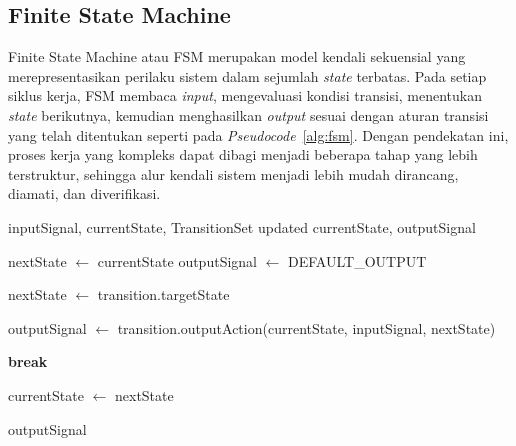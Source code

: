   \subsection{Finite State Machine}

  Finite State Machine atau FSM merupakan model kendali sekuensial yang merepresentasikan
  perilaku sistem dalam sejumlah \emph{state} terbatas. Pada setiap siklus kerja, FSM
  membaca \emph{input}, mengevaluasi kondisi transisi, menentukan \emph{state} berikutnya,
  kemudian menghasilkan \emph{output} sesuai dengan aturan transisi yang telah ditentukan seperti pada \emph{Pseudocode}~\ref{alg:fsm}.
  Dengan pendekatan ini, proses kerja yang kompleks dapat dibagi menjadi beberapa tahap
  yang lebih terstruktur, sehingga alur kendali sistem menjadi lebih mudah dirancang,
  diamati, dan diverifikasi.

  \begin{algorithm}
      \caption{ inite State Machine Algorithm}
      \label{alg:fsm}
      \begin{algorithmic}[1]
      \Require inputSignal, currentState, TransitionSet
      \Ensure updated currentState, outputSignal

          \State nextState $\gets$ currentState
          \State outputSignal $\gets$ DEFAULT\_OUTPUT

                  \State nextState $\gets$ transition.targetState

                  \State outputSignal $\gets$ transition.outputAction(currentState, inputSignal, nextState)

                  \State \textbf{break}
              \EndIf
          \EndFor

          \State currentState $\gets$ nextState

          \State \Return outputSignal
      \EndProcedure
      \end{algorithmic}
  \end{algorithm}


